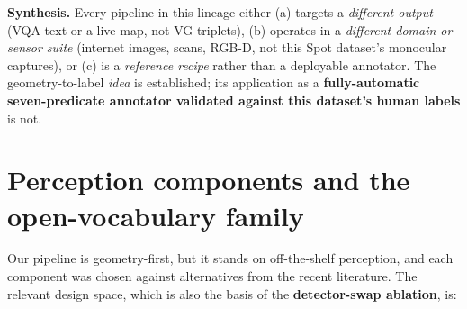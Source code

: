 \textbf{Synthesis.} Every pipeline in this lineage either (a) targets a \textit{different output} (VQA text or a live map, not VG triplets), (b) operates in a \textit{different domain or sensor suite} (internet images, scans, RGB-D, not this Spot dataset's monocular captures), or (c) is a \textit{reference recipe} rather than a deployable annotator. The geometry-to-label \textit{idea} is established; its application as a \textbf{fully-automatic seven-predicate annotator validated against this dataset's human labels} is not.

\section{Perception components and the open-vocabulary family}

Our pipeline is geometry-first, but it stands on off-the-shelf perception, and each component was chosen against alternatives from the recent literature. The relevant design space, which is also the basis of the \textbf{detector-swap ablation}, is:

